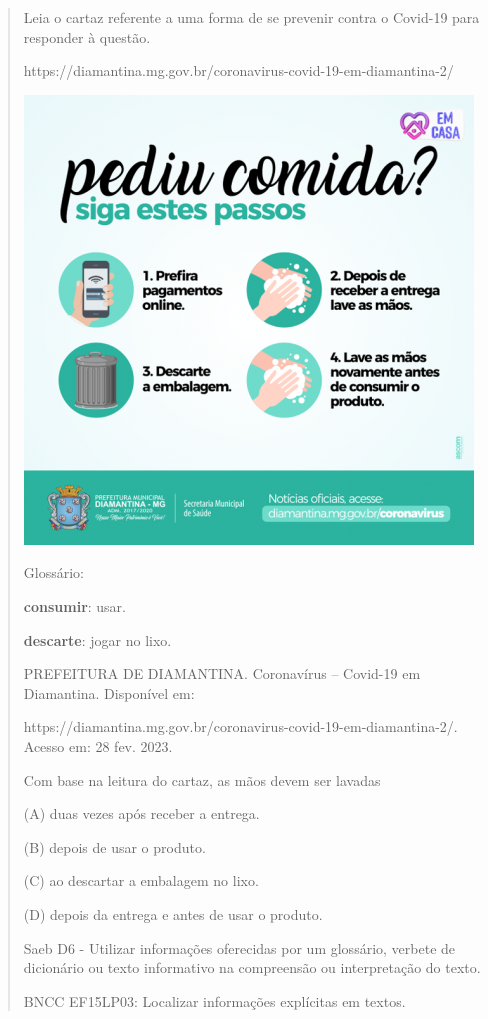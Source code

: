 \begin{quote}
Leia o cartaz referente a uma forma de se prevenir contra o Covid-19
para responder à questão.

https://diamantina.mg.gov.br/coronavirus-covid-19-em-diamantina-2/

\includegraphics[width=4.68750in,height=4.68750in]{media/image36.png}

Glossário:

\textbf{consumir}: usar.

\textbf{descarte}: jogar no lixo.

PREFEITURA DE DIAMANTINA. Coronavírus -- Covid-19 em Diamantina.
Disponível em:

https://diamantina.mg.gov.br/coronavirus-covid-19-em-diamantina-2/.
Acesso em: 28 fev. 2023.

Com base na leitura do cartaz, as mãos devem ser lavadas

(A) duas vezes após receber a entrega.

(B) depois de usar o produto.

(C) ao descartar a embalagem no lixo.

(D) depois da entrega e antes de usar o produto.

Saeb D6 - Utilizar informações oferecidas por um glossário, verbete de
dicionário ou texto informativo na compreensão ou interpretação do
texto.

BNCC EF15LP03: Localizar informações explícitas em textos.


\end{quote}
